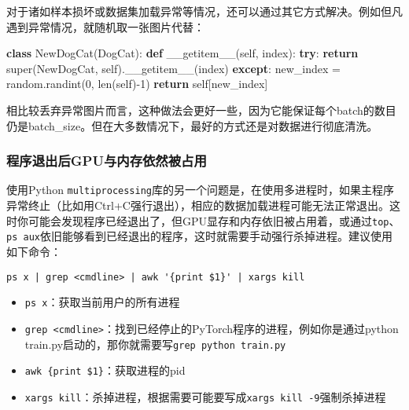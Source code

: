 \documentclass[11pt]{article}
\providecommand{\tightlist}{%
      \setlength{\itemsep}{0pt}\setlength{\parskip}{0pt}}
\newenvironment{Shaded}{}{}
\newcommand{\KeywordTok}[1]{\textcolor[rgb]{0.00,0.44,0.13}{\textbf{{#1}}}}
\newcommand{\DecValTok}[1]{\textcolor[rgb]{0.25,0.63,0.44}{{#1}}}
\newcommand{\FunctionTok}[1]{\textcolor[rgb]{0.02,0.16,0.49}{{#1}}}
\newcommand{\NormalTok}[1]{{#1}}
\newcommand{\VariableTok}[1]{\textcolor[rgb]{0.10,0.09,0.49}{{#1}}}
\newcommand{\ControlFlowTok}[1]{\textcolor[rgb]{0.00,0.44,0.13}{\textbf{{#1}}}}
\newcommand{\OperatorTok}[1]{\textcolor[rgb]{0.40,0.40,0.40}{{#1}}}
\newcommand{\BuiltInTok}[1]{{#1}}
\begin{document}
    对于诸如样本损坏或数据集加载异常等情况，还可以通过其它方式解决。例如但凡遇到异常情况，就随机取一张图片代替：

\begin{Shaded}
\begin{Highlighting}[]
\KeywordTok{class}\NormalTok{ NewDogCat(DogCat):}
    \KeywordTok{def} \FunctionTok{__getitem__}\NormalTok{(}\VariableTok{self}\NormalTok{, index):}
        \ControlFlowTok{try}\NormalTok{:}
            \ControlFlowTok{return} \BuiltInTok{super}\NormalTok{(NewDogCat, }\VariableTok{self}\NormalTok{).}\FunctionTok{__getitem__}\NormalTok{(index)}
        \ControlFlowTok{except}\NormalTok{:}
\NormalTok{            new_index }\OperatorTok{=}\NormalTok{ random.randint(}\DecValTok{0}\NormalTok{, }\BuiltInTok{len}\NormalTok{(}\VariableTok{self}\NormalTok{)}\OperatorTok{-}\DecValTok{1}\NormalTok{)}
            \ControlFlowTok{return} \VariableTok{self}\NormalTok{[new_index]}
\end{Highlighting}
\end{Shaded}

相比较丢弃异常图片而言，这种做法会更好一些，因为它能保证每个batch的数目仍是batch\_size。但在大多数情况下，最好的方式还是对数据进行彻底清洗。

    \subsubsection{程序退出后GPU与内存依然被占用}\label{ux7a0bux5e8fux9000ux51faux540egpuux4e0eux5185ux5b58ux4f9dux7136ux88abux5360ux7528}

使用Python
\texttt{multiprocessing}库的另一个问题是，在使用多进程时，如果主程序异常终止（比如用Ctrl+C强行退出），相应的数据加载进程可能无法正常退出。这时你可能会发现程序已经退出了，但GPU显存和内存依旧被占用着，或通过\texttt{top}、\texttt{ps\ aux}依旧能够看到已经退出的程序，这时就需要手动强行杀掉进程。建议使用如下命令：

\begin{verbatim}
ps x | grep <cmdline> | awk '{print $1}' | xargs kill
\end{verbatim}

\begin{itemize}
\tightlist
\item
  \texttt{ps\ x}：获取当前用户的所有进程
\item
  \texttt{grep\ \textless{}cmdline\textgreater{}}：找到已经停止的PyTorch程序的进程，例如你是通过python
  train.py启动的，那你就需要写\texttt{grep\ \textquotesingle{}python\ train.py\textquotesingle{}}
\item
  \texttt{awk\ \textquotesingle{}\{print\ \$1\}\textquotesingle{}}：获取进程的pid
\item
  \texttt{xargs\ kill}：杀掉进程，根据需要可能要写成\texttt{xargs\ kill\ -9}强制杀掉进程
\end{itemize}
\end{document}
